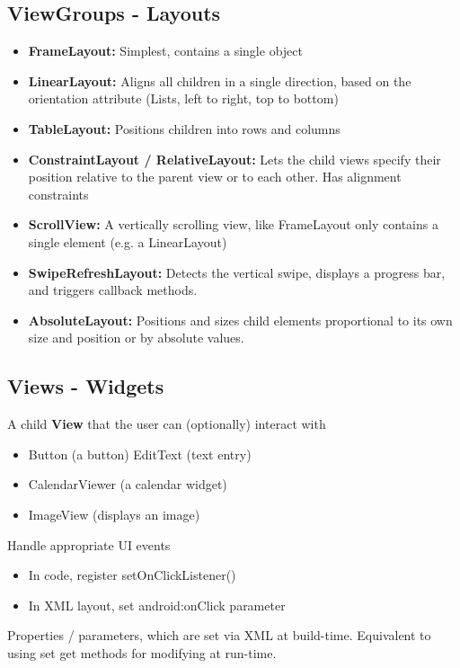 \documentclass{article}
\begin{document}
\subsection{ViewGroups - Layouts}

\begin{itemize}
  \item \textbf{FrameLayout:} Simplest, contains a single object
  \item \textbf{LinearLayout:} Aligns all children in a single direction, based on the orientation attribute (Lists, left to right, top to bottom)
  \item \textbf{TableLayout:} Positions children into rows and columns
  \item \textbf{ConstraintLayout / RelativeLayout:} Lets the child views specify their position relative to the parent view or to each other. Has alignment constraints
  \item \textbf{ScrollView:} A vertically scrolling view, like FrameLayout only contains a single element (e.g. a LinearLayout)
  \item \textbf{SwipeRefreshLayout:} Detects the vertical swipe, displays a progress bar, and triggers callback methods.
  \item \textbf{AbsoluteLayout:} Positions and sizes child elements proportional to its own size and position or by absolute values.
\end{itemize}

\subsection{Views	- Widgets}

A child \textbf{View} that the user can (optionally) interact with
\begin{itemize}
  \item Button (a button) EditText (text entry)
  \item CalendarViewer (a calendar widget)
  \item ImageView (displays an image)
\end{itemize}
Handle	appropriate	UI	events
\begin{itemize}
  \item In code, register setOnClickListener()
  \item In XML layout, set android:onClick parameter
\end{itemize}
Properties / parameters, which are set via XML at build-time. Equivalent to using set get methods for modifying at run-time.
\end{document}
